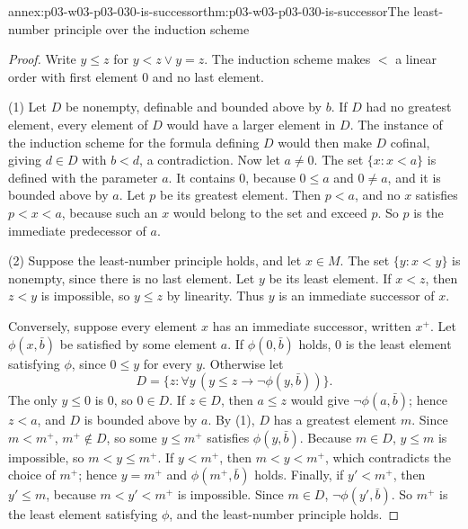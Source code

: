 \begin{annexitem}{annex:p03-w03-p03-030-is-successor}{thm:p03-w03-p03-030-is-successor}{The least-number principle over the induction scheme}
\begin{proof}
Write \(y\le z\) for \(y<z\vee y=z\).  The induction scheme makes \(<\) a
linear order with first element \(0\) and no last element.

(1) Let \(D\) be nonempty, definable and bounded above by \(b\).  If \(D\) had
no greatest element, every element of \(D\) would have a larger element in
\(D\).  The instance of the induction scheme for the formula defining \(D\)
would then make \(D\) cofinal, giving \(d\in D\) with \(b<d\), a
contradiction.  Now let \(a\ne0\).  The set \(\{x:x<a\}\) is defined with
the parameter \(a\).  It contains \(0\), because \(0\le a\) and \(0\ne a\), and
it is bounded above by \(a\).  Let \(p\) be its greatest element.  Then
\(p<a\), and no \(x\) satisfies \(p<x<a\), because such an \(x\) would belong
to the set and exceed \(p\).  So \(p\) is the immediate predecessor of \(a\).

(2) Suppose the least-number principle holds, and let \(x\in M\).  The set
\(\{y:x<y\}\) is nonempty, since there is no last element.  Let \(y\) be its
least element.  If \(x<z\), then \(z<y\) is impossible, so \(y\le z\) by
linearity.  Thus \(y\) is an immediate successor of \(x\).

Conversely, suppose every element \(x\) has an immediate successor, written
\(x^+\).  Let \(\phi(x,\bar b)\) be satisfied by some element \(a\).  If
\(\phi(0,\bar b)\) holds, \(0\) is the least element satisfying \(\phi\),
since \(0\le y\) for every \(y\).  Otherwise let
\[
 D=\{z:\forall y\,(y\le z\rightarrow\neg\phi(y,\bar b))\}.
\]
The only \(y\le0\) is \(0\), so \(0\in D\).  If \(z\in D\), then \(a\le z\)
would give \(\neg\phi(a,\bar b)\); hence \(z<a\), and \(D\) is bounded above by
\(a\).  By (1), \(D\) has a greatest element \(m\).  Since \(m<m^+\),
\(m^+\notin D\), so some \(y\le m^+\) satisfies \(\phi(y,\bar b)\).  Because
\(m\in D\), \(y\le m\) is impossible, so \(m<y\le m^+\).  If \(y<m^+\), then
\(m<y<m^+\), which contradicts the choice of \(m^+\); hence \(y=m^+\) and
\(\phi(m^+,\bar b)\) holds.  Finally, if \(y'<m^+\), then \(y'\le m\),
because \(m<y'<m^+\) is impossible.  Since \(m\in D\), \(\neg\phi(y',\bar
b)\).  So \(m^+\) is the least element satisfying \(\phi\), and the
least-number principle holds.
\end{proof}
\end{annexitem}

